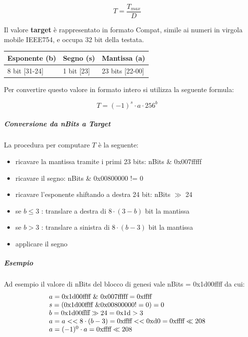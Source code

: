 \documentclass{article}
\begin{document}
\begin{equation}
    T = \frac{T_{max}}{D} \label{targetFromDiff}
\end{equation}

Il valore \textbf{target} è rappresentato in formato Compat, simile ai numeri in virgola mobile IEEE754, e occupa 32 bit della testata.

\begin{table}[ht]
    \centering
    \begin{tabular}{|l|l|l|}
        \hline
        \multicolumn{1}{|c|}{Esponente (b)} & \multicolumn{1}{c|}{Segno (s)} & \multicolumn{1}{c|}{Mantissa (a)} \\ \hline
        8 bit {[}31-24{]}               & 1 bit {[}23{]}             & 23 bits {[}22-00{]}           \\ \hline
    \end{tabular}
\end{table}

Per convertire questo valore in formato intero si utilizza la seguente formula:

\begin{equation}
    T = (-1)^{s} \cdot a \cdot 256^{b}
\end{equation}

\subparagraph{Conversione da nBits a Target}

La procedura per computare $T$ è la seguente:

\begin{itemize}
    \item ricavare la mantissa tramite i primi 23 bits: nBits \& 0x007fffff
    \item ricavare il segno: nBits \& 0x00800000 != 0
    \item ricavare l'esponente shiftando a destra 24 bit: nBits $\gg$ 24
    \item se $b \le 3$ : translare a destra di $8 \cdot {(3 - b)}$ bit la mantissa
    \item se $b > 3$ : translare a sinistra di $8 \cdot {(b - 3)}$ bit la mantissa
    \item applicare il segno
\end{itemize}


\subparagraph{Esempio}
Ad esempio il valore di nBits del blocco di genesi vale nBits = 0x1d00ffff da cui:
\begin{equation}
    \begin{array}{ll}
        a = \textnormal{0x1d00ffff} \ \& \ \textnormal{0x007fffff} = \textnormal{0xffff} \\
        s = (\textnormal{0x1d00ffff} \ \& \textnormal{0x00800000} != 0) = 0 \\
        b = \textnormal{0x1d00ffff} \gg 24 = \textnormal{0x1d} > 3\\
        a = a << 8 \cdot (b - 3) = \textnormal{0xffff} << \textnormal{0xd0} = \textnormal{0xffff} \ll 208 \\
        a = (-1)^0 \cdot a =  \textnormal{0xffff} \ll 208
    \end{array}
\end{equation}
\end{document}
